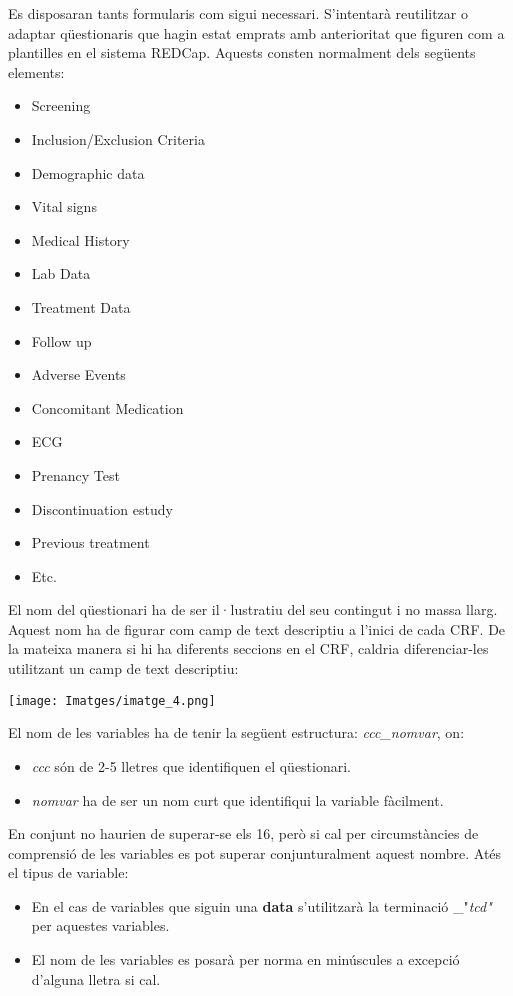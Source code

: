 \documentclass[
]{article}
\providecommand{\tightlist}{%
  \setlength{\itemsep}{0pt}\setlength{\parskip}{0pt}}
\begin{document}
Es disposaran tants formularis com sigui necessari. S'intentarà reutilitzar o adaptar qüestionaris que hagin estat emprats amb anterioritat que figuren com a plantilles en el sistema REDCap. Aquests consten normalment dels següents elements:

\begin{itemize}
\tightlist
\item
  Screening
\item
  Inclusion/Exclusion Criteria
\item
  Demographic data
\item
  Vital signs
\item
  Medical History
\item
  Lab Data
\item
  Treatment Data
\item
  Follow up
\item
  Adverse Events
\item
  Concomitant Medication
\item
  ECG
\item
  Prenancy Test
\item
  Discontinuation estudy
\item
  Previous treatment
\item
  Etc.
\end{itemize}

El nom del qüestionari ha de ser il·lustratiu del seu contingut i no massa llarg. Aquest nom ha de figurar com camp de text descriptiu a l'inici de cada CRF. De la mateixa manera si hi ha diferents seccions en el CRF, caldria diferenciar-les utilitzant un camp de text descriptiu:

\texttt{[image: Imatges/imatge\_4.png]}

El nom de les variables ha de tenir la següent estructura: \emph{ccc\_nomvar}, on:

\begin{itemize}
\tightlist
\item
  \emph{ccc} són de 2-5 lletres que identifiquen el qüestionari.
\item
  \emph{nomvar} ha de ser un nom curt que identifiqui la variable fàcilment.
\end{itemize}

En conjunt no haurien de superar-se els 16, però si cal per circumstàncies de comprensió de les variables es pot superar conjunturalment aquest nombre. Atés el tipus de variable:

\begin{itemize}
\tightlist
\item
  En el cas de variables que siguin una \textbf{data} s'utilitzarà la terminació \_"\emph{tcd"} per aquestes variables.
\item
  El nom de les variables es posarà per norma en minúscules a excepció d'alguna lletra si cal.
\end{itemize}
\end{document}
